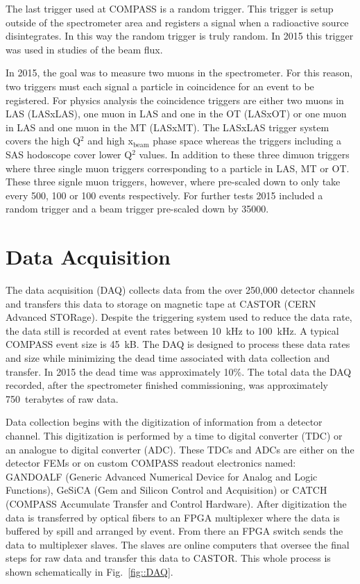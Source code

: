 The last trigger used at COMPASS is a random trigger.  This trigger is setup
outside of the spectrometer area and registers a signal when a radioactive
source disintegrates.  In this way the random trigger is truly random.  In 2015
this trigger was used in studies of the beam flux.

In 2015, the goal was to measure two muons in the spectrometer.  For this
reason, two triggers must each signal a particle in coincidence for an event to
be registered.  For physics analysis the coincidence triggers are either two
muons in LAS (LASxLAS), one muon in LAS and one in the OT (LASxOT) or one muon
in LAS and one muon in the MT (LASxMT).  The LASxLAS trigger system covers the
high Q$^2$ and high x$_{\mathrm{beam}}$ phase space whereas the triggers
including a SAS hodoscope cover lower Q$^2$ values.  In addition to these three
dimuon triggers where three single muon triggers corresponding to a particle in
LAS, MT or OT.  These three signle muon triggers, however, where pre-scaled down
to only take every 500, 100 or 100 events respectively.  For further tests 2015
included a random trigger and a beam trigger pre-scaled down by 35000.


\section{Data Acquisition}
The data acquisition (DAQ) collects data from the over 250,000 detector channels
and transfers this data to storage on magnetic tape at CASTOR (CERN Advanced
STORage).  Despite the triggering system used to reduce the data rate, the data
still is recorded at event rates between 10~kHz to 100~kHz.  A typical COMPASS
event size is 45~kB.  The DAQ is designed to process these data rates and size
while minimizing the dead time associated with data collection and transfer. In
2015 the dead time was approximately 10\%.  The total data the DAQ recorded,
after the spectrometer finished commissioning, was approximately 750~terabytes
of raw data. \par

Data collection begins with the digitization of information from a detector
channel.  This digitization is performed by a time to digital converter (TDC) or
an analogue to digital converter (ADC). These TDCs and ADCs are either on the
detector FEMs or on custom COMPASS readout electronics named: GANDOALF (Generic
Advanced Numerical Device for Analog and Logic Functions), GeSiCA (Gem and
Silicon Control and Acquisition) or CATCH (COMPASS Accumulate Transfer and
Control Hardware).  After digitization the data is transferred by optical fibers
to an FPGA multiplexer where the data is buffered by spill and arranged by
event.  From there an FPGA switch sends the data to multiplexer slaves.  The
slaves are online computers that oversee the final steps for raw data and
transfer this data to CASTOR.  This whole process is shown schematically in
Fig.~\ref{fig::DAQ}.

